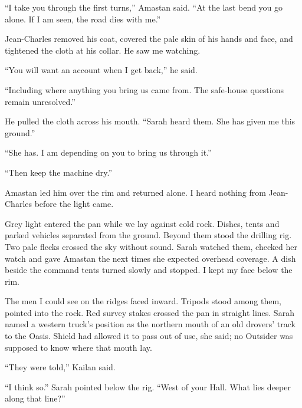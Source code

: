 ``I take you through the first turns,'' Amastan said. ``At the last bend you go alone. If I am seen, the road dies with me.''\par

Jean-Charles removed his coat, covered the pale skin of his hands and face, and tightened the cloth at his collar. He saw me watching.\par

``You will want an account when I get back,'' he said.\par

``Including where anything you bring us came from. The safe-house questions remain unresolved.''\par

He pulled the cloth across his mouth. ``Sarah heard them. She has given me this ground.''\par

``She has. I am depending on you to bring us through it.''\par

``Then keep the machine dry.''\par

Amastan led him over the rim and returned alone. I heard nothing from Jean-Charles before the light came.\par

Grey light entered the pan while we lay against cold rock. Dishes, tents and parked vehicles separated from the ground. Beyond them stood the drilling rig. Two pale flecks crossed the sky without sound. Sarah watched them, checked her watch and gave Amastan the next times she expected overhead coverage. A dish beside the command tents turned slowly and stopped. I kept my face below the rim.\par

The men I could see on the ridges faced inward. Tripods stood among them, pointed into the rock. Red survey stakes crossed the pan in straight lines. Sarah named a western truck's position as the northern mouth of an old drovers' track to the Oasis. Shield had allowed it to pass out of use, she said; no Outsider was supposed to know where that mouth lay.\par

``They were told,'' Kailan said.\par

``I think so.'' Sarah pointed below the rig. ``West of your Hall. What lies deeper along that line?''\par

